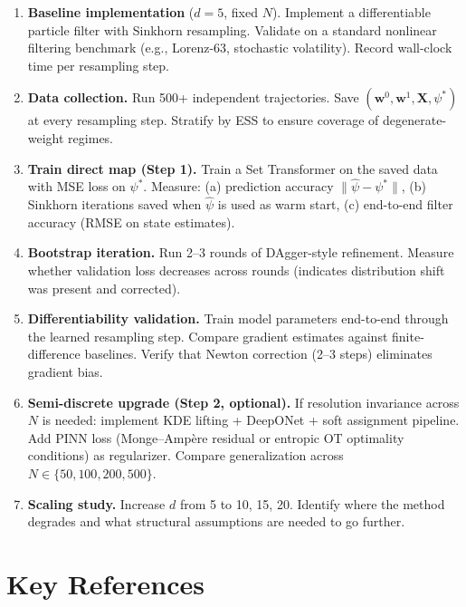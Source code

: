 \documentclass[11pt]{article}
\newcommand{\bw}{\mathbf{w}}
\newcommand{\bX}{\mathbf{X}}
\begin{document}
\begin{enumerate}[leftmargin=1.5em]
    \item \textbf{Baseline implementation} ($d=5$, fixed $N$). Implement a differentiable particle filter with Sinkhorn resampling. Validate on a standard nonlinear filtering benchmark (e.g., Lorenz-63, stochastic volatility). Record wall-clock time per resampling step.

    \item \textbf{Data collection.} Run 500+ independent trajectories. Save $(\bw^0, \bw^1, \bX, \psi^*)$ at every resampling step. Stratify by ESS to ensure coverage of degenerate-weight regimes.

    \item \textbf{Train direct map (Step 1).} Train a Set Transformer on the saved data with MSE loss on $\psi^*$. Measure: (a) prediction accuracy $\|\hat\psi - \psi^*\|$, (b) Sinkhorn iterations saved when $\hat\psi$ is used as warm start, (c) end-to-end filter accuracy (RMSE on state estimates).

    \item \textbf{Bootstrap iteration.} Run 2--3 rounds of DAgger-style refinement. Measure whether validation loss decreases across rounds (indicates distribution shift was present and corrected).

    \item \textbf{Differentiability validation.} Train model parameters end-to-end through the learned resampling step. Compare gradient estimates against finite-difference baselines. Verify that Newton correction (2--3 steps) eliminates gradient bias.

    \item \textbf{Semi-discrete upgrade (Step 2, optional).} If resolution invariance across $N$ is needed: implement KDE lifting + DeepONet + soft assignment pipeline. Add PINN loss (Monge--Amp\`ere residual or entropic OT optimality conditions) as regularizer. Compare generalization across $N \in \{50, 100, 200, 500\}$.

    \item \textbf{Scaling study.} Increase $d$ from 5 to 10, 15, 20. Identify where the method degrades and what structural assumptions are needed to go further.
\end{enumerate}

\section{Key References}
\end{document}
